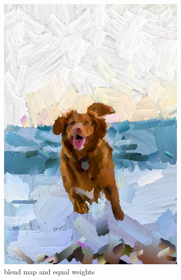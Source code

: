 \documentclass[11pt]{article}
\begin{document}
\begin{figure}[ht]
\begin{subfigure}[b]{0.24\textwidth}
         \includegraphics[width=\textwidth]{blend-equal.png}
         \caption{blend map and equal weights}
         \label{fig:be}
     \end{subfigure}
    \hfill
     \begin{subfigure}[b]{0.24\textwidth}
         \centering

\end{subfigure}
\end{figure}
\end{document}
